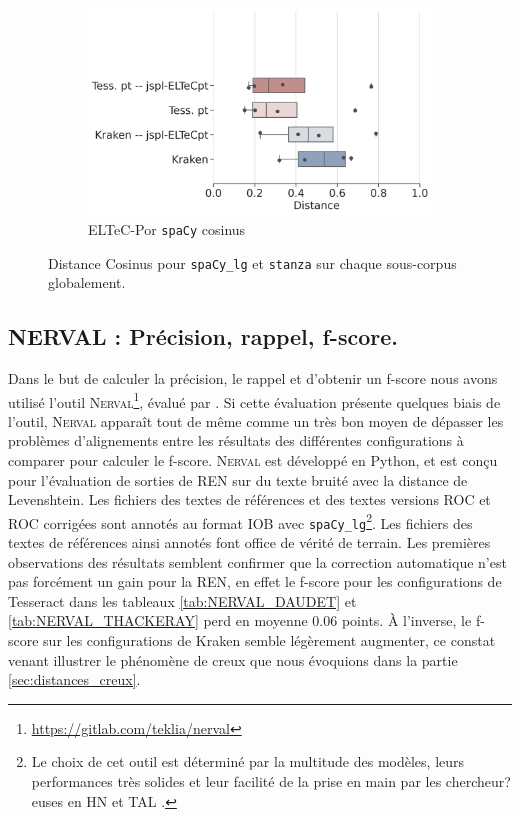 \begin{figure}
      \begin{subfigure}{0.45\textwidth}
        \caption*{}
   \end{subfigure}
    \begin{subfigure}{0.5\textwidth}
  \includegraphics[height=.65\textwidth]{IMAGES/Boite-moustache/ELTeC-Por_spaCy3.5.1_cosinus.png} 
        \caption{ELTeC-Por \texttt{spaCy} cosinus}
   \end{subfigure}
    \caption{Distance Cosinus pour \texttt{spaCy\_lg} et \texttt{stanza} sur chaque sous-corpus globalement.}
    \label{fig:Cosinus-spacy-lg-stanza}
\end{figure}

\subsection{\textsc{NERVAL} : Précision, rappel, f-score.}

Dans le but de calculer la précision, le rappel et d'obtenir un f-score nous avons utilisé l'outil \textsc{Nerval}\footnote{\url{https://gitlab.com/teklia/nerval}}, évalué par \cite{koudoro2022reconnaissance}. Si cette évaluation présente quelques biais de l'outil, \textsc{Nerval} apparaît tout de même comme un très bon moyen de dépasser les problèmes d'alignements entre les résultats des différentes configurations à comparer pour calculer le f-score. \textsc{Nerval} est développé en Python, et est conçu pour l'évaluation de sorties de REN sur du texte bruité avec la distance de Levenshtein. Les fichiers des textes de références et des textes versions ROC et ROC corrigées sont annotés au format IOB avec \texttt{spaCy\_lg}\footnote{Le choix de cet outil est déterminé par la multitude des modèles, leurs performances très solides et leur facilité de la prise en main par les chercheur?euses en HN et TAL \cite{DBLP:conf/gis/Koudoro-Parfait21}.}. Les fichiers des textes de références ainsi annotés font office de vérité de terrain.
Les premières observations des résultats semblent confirmer que la correction automatique n'est pas forcément un gain pour la REN, en effet le f-score pour les configurations de Tesseract dans les tableaux \ref{tab:NERVAL_DAUDET} et \ref{tab:NERVAL_THACKERAY} perd en moyenne 0.06 points. À l'inverse, le f-score sur les configurations de Kraken semble légèrement augmenter, ce constat venant illustrer le phénomène de creux que nous évoquions dans la partie \ref{sec:distances_creux}.

